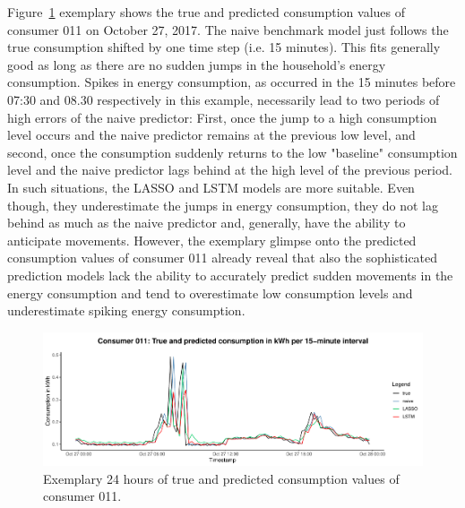 Figure~\ref{Fig:glimpse_predcons} exemplary shows the true and predicted consumption values of consumer 011 on October 27, 2017. The naive benchmark model just follows the true consumption shifted by one time step (i.e. 15 minutes). This fits generally good as long as there are no sudden jumps in the household's energy consumption. Spikes in energy consumption, as occurred in the 15 minutes before 07:30 and 08.30 respectively in this example, necessarily lead to two periods of high errors of the naive predictor: First, once the jump to a high consumption level occurs and the naive predictor remains at the previous low level, and second, once the consumption suddenly returns to the low "baseline" consumption level and the naive predictor lags behind at the high level of the previous period. In such situations, the LASSO and LSTM models are more suitable. Even though, they underestimate the jumps in energy consumption, they do not lag behind as much as the naive predictor and, generally, have the ability to anticipate movements. However, the exemplary glimpse onto the predicted consumption values of consumer 011 already reveal that also the sophisticated prediction models lack the ability to accurately predict sudden movements in the energy consumption and tend to overestimate low consumption levels and underestimate spiking energy consumption.
%
\begin{figure}[htbp]
    \centering
    \includegraphics[width=\textwidth]{thesis/graphs/evaluation/c011_pred_cons.pdf}
    \caption[Exemplary 24 hours of true and predicted consumption values]{Exemplary 24 hours of true and predicted consumption values of consumer 011. \quantnet\href{}{}}
    \label{Fig:glimpse_predcons}
\end{figure}
%
